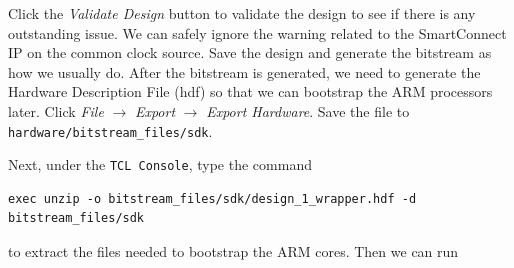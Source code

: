 \documentclass[11pt]{article}
\begin{document}
Click the \emph{Validate Design} button to validate the design to see if there is any outstanding issue. We can safely ignore the warning related to the SmartConnect IP on the common clock source. Save the design and generate the bitstream as how we usually do. After the bitstream is generated, we need to generate the Hardware Description File (hdf) so that we can bootstrap the ARM processors later. Click \emph{File} $\rightarrow$ \emph{Export} $\rightarrow$ \emph{Export Hardware}. Save the file to \verb|hardware/bitstream_files/sdk|.

\begin{center}
\end{center}


Next, under the \texttt{TCL Console}, type the command

\begin{verbatim}
exec unzip -o bitstream_files/sdk/design_1_wrapper.hdf -d bitstream_files/sdk
\end{verbatim}

\begin{center}
\end{center}

to extract the files needed to bootstrap the ARM cores. Then we can run
\end{document}
